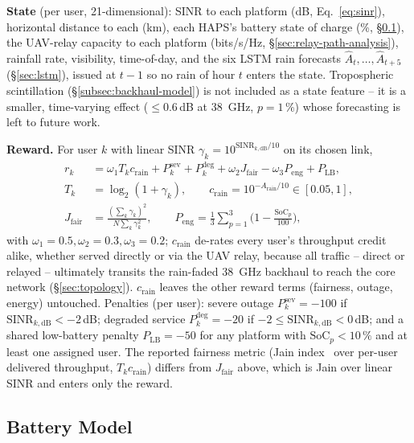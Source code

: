 \documentclass[]{ieeeaccess}
\begin{document}
\textbf{State} (per user, 21-dimensional): SINR to each platform (dB, Eq.~\eqref{eq:sinr}), horizontal distance to each (km), each HAPS's battery state of charge (\%, \S\ref{subsec:battery}), the UAV-relay capacity to each platform (bits/s/Hz, \S\ref{sec:relay-path-analysis}), rainfall rate, visibility, time-of-day, and the six LSTM rain forecasts $\hat{A}_t,\dots,\hat{A}_{t+5}$ (\S\ref{sec:lstm}), issued at $t-1$ so no rain of hour $t$ enters the state. Tropospheric scintillation (\S\ref{subsec:backhaul-model}) is not included as a state feature -- it is a smaller, time-varying effect ($\le$0.6\,dB at 38~GHz, $p=1\,\%$) whose forecasting is left to future work.

\textbf{Reward.} For user $k$ with linear SINR $\gamma_k=10^{\mathrm{SINR}_{k,\mathrm{dB}}/10}$ on its chosen link,
\begin{align}
r_k &= \omega_1 T_k c_\mathrm{rain} + P^\mathrm{sev}_k + P^\mathrm{deg}_k + \omega_2 J_\mathrm{fair} - \omega_3 P_\mathrm{eng} + P_\mathrm{LB},\nonumber\\
T_k &= \log_2(1+\gamma_k), \qquad c_\mathrm{rain}=10^{-A_\mathrm{rain}/10}\in[0.05,1],\nonumber\\
J_\mathrm{fair} &= \frac{(\sum_k\gamma_k)^2}{N\sum_k\gamma_k^2}, \qquad P_\mathrm{eng}=\frac{1}{3}\sum_{p=1}^3\Big(1-\frac{\mathrm{SoC}_p}{100}\Big),
\label{eq:reward}
\end{align}
with $\omega_1=0.5,\omega_2=0.3,\omega_3=0.2$; $c_\mathrm{rain}$ de-rates every user's throughput credit alike, whether served directly or via the UAV relay, because all traffic -- direct or relayed -- ultimately transits the rain-faded 38~GHz backhaul to reach the core network (\S\ref{sec:topology}). $c_\mathrm{rain}$ leaves the other reward terms (fairness, outage, energy) untouched. Penalties (per user): severe outage $P^\mathrm{sev}_k=-100$ if $\mathrm{SINR}_{k,\mathrm{dB}}<-2$\,dB; degraded service $P^\mathrm{deg}_k=-20$ if $-2\le\mathrm{SINR}_{k,\mathrm{dB}}<0$\,dB; and a shared low-battery penalty $P_\mathrm{LB}=-50$ for any platform with $\mathrm{SoC}_p<10\,\%$ and at least one assigned user. The reported fairness metric (Jain index~\cite{jain1984quantitative} over per-user delivered throughput, $T_kc_\mathrm{rain}$) differs from $J_\mathrm{fair}$ above, which is Jain over linear SINR and enters only the reward.

\subsection{Battery Model}
\label{subsec:battery}
\end{document}
